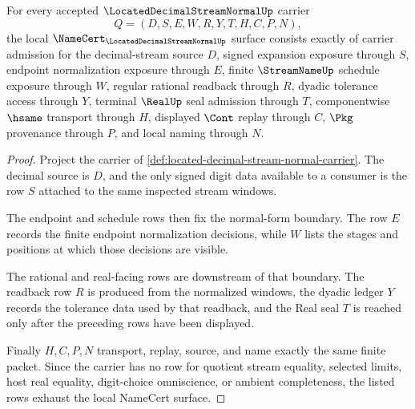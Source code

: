 \begin{theorem}
\label{thm:located-decimal-stream-normal-namecert-obligations}
For every accepted $\LocatedDecimalStreamNormalUp$ carrier
$$
Q=(D,S,E,W,R,Y,T,H,C,P,N),
$$
the local $\NameCert_{\LocatedDecimalStreamNormalUp}$ surface consists exactly of carrier admission for the decimal-stream source $D$, signed expansion exposure through $S$, endpoint normalization exposure through $E$, finite $\StreamNameUp$ schedule exposure through $W$, regular rational readback through $R$, dyadic tolerance access through $Y$, terminal $\RealUp$ seal admission through $T$, componentwise $\hsame$ transport through $H$, displayed $\Cont$ replay through $C$, $\Pkg$ provenance through $P$, and local naming through $N$.
\end{theorem}
\begin{proof}
Project the carrier of \autoref{def:located-decimal-stream-normal-carrier}. The decimal source is $D$, and the only signed digit data available to a consumer is the row $S$ attached to the same inspected stream windows.

The endpoint and schedule rows then fix the normal-form boundary. The row $E$ records the finite endpoint normalization decisions, while $W$ lists the stages and positions at which those decisions are visible.

The rational and real-facing rows are downstream of that boundary. The readback row $R$ is produced from the normalized windows, the dyadic ledger $Y$ records the tolerance data used by that readback, and the Real seal $T$ is reached only after the preceding rows have been displayed.

Finally $H,C,P,N$ transport, replay, source, and name exactly the same finite packet. Since the carrier has no row for quotient stream equality, selected limits, host real equality, digit-choice omniscience, or ambient completeness, the listed rows exhaust the local NameCert surface.
\end{proof}

